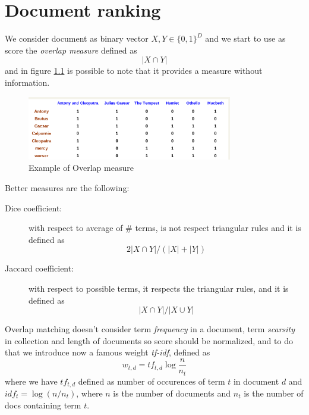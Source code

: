 \chapter{Document ranking}
We consider document as binary vector $X, Y \in \{0, 1\}^D$ and we start to use 
as score the \emph{overlap measure} defined as 
\[ |X \cap Y| \]
and in figure \ref{img:overlap} is possible to note that it provides a measure without information.

\begin{figure}
	\includegraphics[width=0.8\textwidth]{Images/exampleOverlap}
	\caption{Example of Overlap measure}
	\label{img:overlap}
\end{figure}
Better measures are the following:
\begin{description}
	\item [Dice coefficient: ] with respect to average of $\#$ terms, is not respect triangular rules and it is defined as 
		\[ 2 |X \cap Y| / (|X| + |Y|) \]
	\item [Jaccard coefficient: ] with respect to possible terms, it respects the triangular rules, and it is defined as 
		\[ |X \cap Y| / |X \cup Y| \]
\end{description}
Overlap matching doesn’t consider term \emph{frequency} in a document, term \emph{scarsity} in collection and length of documents so 
score should be normalized, and to do that we introduce now a famous weight \emph{tf-idf}, defined as
\[ w_{t, d} = tf_{t, d} \log \frac{n}{n_t} \]
where we have $tf_{t, d}$ defined as number of occurences of term $t$ in document $d$ and $idf_t = \log (n/n_t)$, 
where $n$ is the number of documents and $n_t$ is the number of docs containing term $t$.

